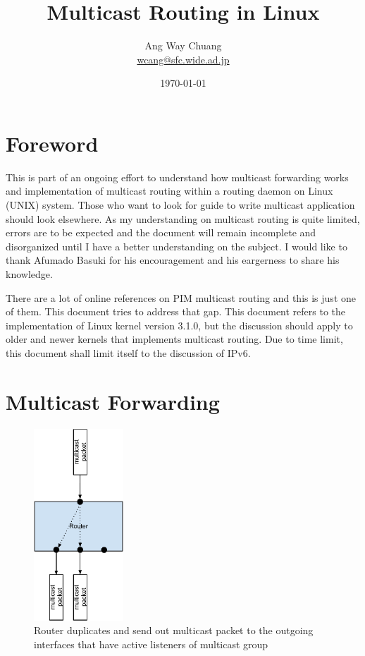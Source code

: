 \documentclass{article}
\begin{document}
\title{Multicast Routing in Linux}
\author{Ang Way Chuang \\
\small{\href{mailto:wcang@sfc.wide.ad.jp}{wcang@sfc.wide.ad.jp}}}
\date{\today}
\maketitle
\section{Foreword}
This is part of an ongoing effort to understand how multicast forwarding works
and implementation of multicast routing within a routing daemon on Linux (UNIX)
system. Those who want to look for guide to write multicast application should
look elsewhere. As my understanding on multicast routing is quite limited,
errors are to be expected and the document will remain incomplete and
disorganized until I have a better understanding on the subject. I would like to
thank Afumado Basuki for his encouragement and his eargerness to share his
knowledge. 

There are a lot of online references on PIM multicast routing and this is just
one of them. This document tries to address that gap. This document refers to
the implementation of Linux kernel version 3.1.0, but the discussion should
apply to older and newer kernels that implements multicast routing. Due to time
limit, this document shall limit itself to the discussion of IPv6.

\section{Multicast Forwarding}
\begin{figure}[h]
  \begin{center}
    \includegraphics[width=0.3\textwidth]{mcast-forward}
    \caption{Router duplicates and send out multicast packet to the
    outgoing interfaces that have active listeners of multicast group}
    \label{fig:mcast-forward}
  \end{center}
\end{figure}
\end{document}
